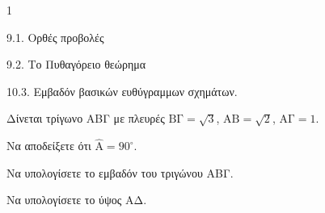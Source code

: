 \begin{ylh}{1}
    \item 9.1. Ορθές προβολές
    \item 9.2. Το Πυθαγόρειο θεώρημα
    \item 10.3. Εμβαδόν βασικών ευθύγραμμων σχημάτων.
\end{ylh}
Δίνεται τρίγωνο ΑΒΓ με πλευρές $\text{ΒΓ} = \sqrt{3}$, $\text{ΑΒ} = \sqrt{2}$, $\text{ΑΓ} = 1$.
\begin{alist}
\item Να αποδείξετε ότι $\widehat{\text{Α}} = 90^\circ$.  
\item Να υπολογίσετε το εμβαδόν του τριγώνου ΑΒΓ.  
\item Να υπολογίσετε το ύψος ΑΔ.  
\end{alist}
